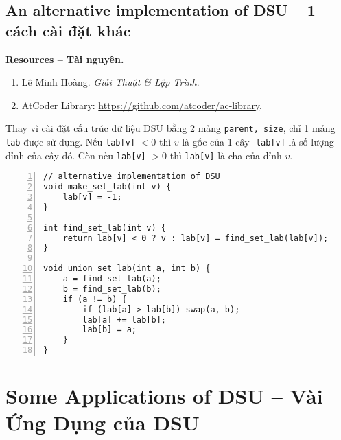 \documentclass{article}
\begin{document}
\subsection{An alternative implementation of DSU -- 1 cách cài đặt khác}
\textbf{\textsf{Resources -- Tài nguyên.}}
\begin{enumerate}
    \item {\sc Lê Minh Hoàng}. {\it Giải Thuật \& Lập Trình}.

    \item AtCoder Library: \url{https://github.com/atcoder/ac-library}.
\end{enumerate}
Thay vì cài đặt cấu trúc dữ liệu DSU bằng 2 mảng {\tt parent, size}, chỉ 1 mảng {\tt lab} được sử dụng. Nếu {\tt lab[v]} $< 0$ thì $v$ là gốc của 1 cây -{\tt lab[v]} là số lượng đỉnh của cây đó. Còn nếu {\tt lab[v]} $> 0$ thì {\tt lab[v]} là cha của đỉnh $v$.
\begin{Verbatim}[numbers=left,xleftmargin=5mm]
// alternative implementation of DSU
void make_set_lab(int v) {
    lab[v] = -1;
}

int find_set_lab(int v) {
    return lab[v] < 0 ? v : lab[v] = find_set_lab(lab[v]);
}

void union_set_lab(int a, int b) {
    a = find_set_lab(a);
    b = find_set_lab(b);
    if (a != b) {
        if (lab[a] > lab[b]) swap(a, b);
        lab[a] += lab[b];
        lab[b] = a;
    }
}
\end{Verbatim}


\section{Some Applications of DSU -- Vài Ứng Dụng của DSU}

\end{document}
